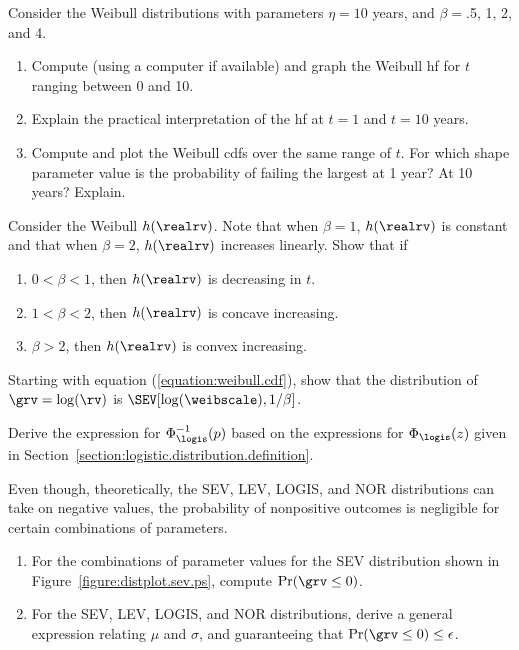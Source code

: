 \begin{exercise}
Consider the Weibull distributions with parameters $\eta=10$ years,
and $\beta=$.5, 1, 2, and 4.
\begin{enumerate} 
\item 
Compute (using a computer if available) and graph the Weibull
hf for $t$ ranging between 0 and 10.
\item
Explain the practical interpretation of the hf
at $t=1$ and $t=10$ years.
\item
Compute and plot the Weibull cdfs over the same range of $t$. For
which shape parameter value
is the probability of failing the largest at 1 year? At 10 years? Explain.	 
\end{enumerate}
\end{exercise}
\begin{exercise}
Consider the Weibull $h(\realrv)$.  Note that
when $\beta=1$, $h{(\realrv)}$ is constant and that when $\beta=2$,
$h(\realrv)$ increases linearly.  	 Show that if
\begin{enumerate} 
\item 
$0< \beta < 1$, then $h(\realrv)$ is decreasing in $t$.  	 
\item 
$1< \beta < 2$, then $h(\realrv)$ is concave increasing.
\item 
$\beta > 2$, then $h(\realrv)$
is convex increasing.  	 
\end{enumerate}
\end{exercise}

\begin{exercise}
Starting with equation (\ref{equation:weibull.cdf}), show that the
distribution of $\grv=\log(\rv)$ is $\SEV[\log(\weibscale),1/\beta]$.
\end{exercise}

\begin{exercise}
Derive the expression for $\Phi_{\logis}^{-1}(p)$ based on the
expressions for $\Phi_{\logis}(z)$ given in
Section~\ref{section:logistic.distribution.definition}.
\end{exercise}

\begin{exercise}
Even though, theoretically, the SEV, LEV, LOGIS, and NOR distributions
can take on negative values, the probability of nonpositive outcomes is 
negligible for certain combinations of parameters.
\begin{enumerate}
\item
For the combinations of parameter values for the SEV distribution
shown in Figure~\ref{figure:distplot.sev.ps}, compute $\Pr(\grv \leq
0)$.
\item
For the SEV, LEV, LOGIS, and NOR distributions, derive a general
expression relating
$\mu$ and $\sigma$, and guaranteeing that $\Pr(\grv \leq 0) \leq
\epsilon $.
\end{enumerate}
\end{exercise}


